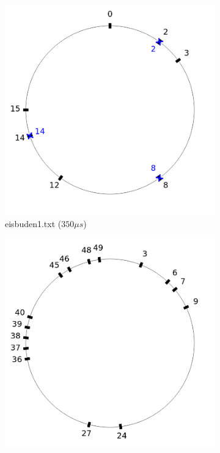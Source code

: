 \documentclass[a4paper,10pt,ngerman,captions=figureheading]{scrartcl}
\newcommand{\imageWidth}{0.3\linewidth}
\begin{document}
\begin{figure}[ht]
    \centering
    \caption{Beispiele vom BWINF}
    \label{fig:BWINF_Beispiele}
    \begin{subfigure}[t]{\imageWidth}
        \includegraphics[width=\linewidth]{eisbuden1.png}
        \caption{eisbuden1.txt ($350\mu s$)}
        \label{fig:eisbuden1}
    \end{subfigure}
    \begin{subfigure}[t]{\imageWidth}
        \includegraphics[width=\linewidth]{eisbuden2.png}

\end{subfigure}
\end{figure}
\end{document}
